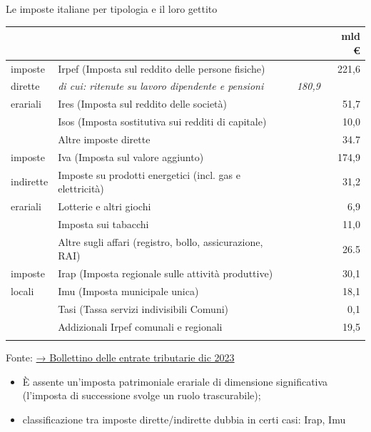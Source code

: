 \documentclass[aspectratio=64,12pt]{beamer}
\begin{document}
\begin{frame}{Le imposte italiane per tipologia e il loro gettito}
\begin{resize}{.7}
\begin{center}
\begin{tabular}{llrr}
 &  &  & mld €\\[0pt]
\hline
imposte & \alert{Irpef} (Imposta sul reddito delle persone fisiche) &  & 221,6\\[0pt]
dirette & \emph{di cui: ritenute su lavoro dipendente e pensioni} & \emph{180,9} & \\[0pt]
erariali & \alert{Ires} (Imposta sul reddito delle società) &  & 51,7\\[0pt]
 & \alert{Isos} (Imposta sostitutiva sui redditi di capitale) &  & 10,0\\[0pt]
 & Altre imposte dirette &  & 34.7\\[0pt]
\hline
imposte & \alert{Iva} (Imposta sul valore aggiunto) &  & 174,9\\[0pt]
indirette & Imposte su prodotti energetici (incl. gas e elettricità) &  & 31,2\\[0pt]
erariali & Lotterie e altri giochi &  & 6,9\\[0pt]
 & Imposta sui tabacchi &  & 11,0\\[0pt]
 & Altre sugli affari (registro, bollo, assicurazione, RAI) &  & 26.5\\[0pt]
\hline
imposte & \alert{Irap} (Imposta regionale sulle attività produttive) &  & 30,1\\[0pt]
locali & \alert{Imu} (Imposta municipale unica) &  & 18,1\\[0pt]
 & \alert{Tasi} (Tassa servizi indivisibili Comuni) &  & 0,1\\[0pt]
 & Addizionali Irpef comunali e regionali &  & 19,5\\[0pt]
 &  &  & \\[0pt]
\end{tabular}
\end{center}
\vspace{-3mm}
{\footnotesize Fonte: \href{https://www.finanze.gov.it/export/sites/finanze/.galleries/Documenti/entrate_tributarie_2023/Bollettino-entrate-Dicembre2023.pdf}{→ Bollettino delle entrate tributarie dic 2023}}
\end{resize}
\begin{itemize}
\item È assente un'imposta patrimoniale erariale di dimensione significativa
(l'imposta di successione svolge un ruolo trascurabile);
\item classificazione tra imposte dirette/indirette dubbia in certi casi: Irap, Imu
\end{itemize}
\end{frame}
\end{document}
